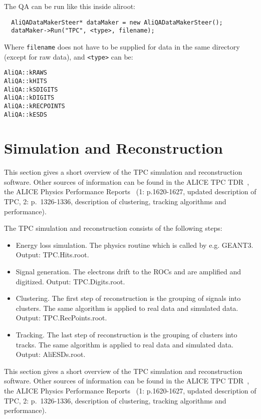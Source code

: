 \documentclass[a4paper,12pt]{article}
\begin{document}
The QA can be run like this inside aliroot:

\begin{verbatim}
  AliQADataMakerSteer* dataMaker = new AliQADataMakerSteer();
  dataMaker->Run("TPC", <type>, filename);  
\end{verbatim}

Where \texttt{filename} does not have to be supplied for data in the
same directory (except for raw data), and \texttt{<type>} can be:

\begin{verbatim}
AliQA::kRAWS
AliQA::kHITS
AliQA::kSDIGITS
AliQA::kDIGITS
AliQA::kRECPOINTS
AliQA::kESDS
\end{verbatim}

\newpage

\section{Simulation and Reconstruction}

This section gives a short overview of the TPC simulation and
reconstruction software. Other sources of information can be found in
the ALICE TPC TDR~\cite{tpctdr}, the ALICE Physics Performance
Reports~\cite{Carminati:2004fp,Alessandro:2006yt} (1: p.1620-1627,
updated description of TPC, 2: p.~1326-1336, description of
clustering, tracking algorithms and performance).

The TPC simulation and reconstruction consists of the following steps:
\begin{itemize}
\item Energy loss simulation. The physics routine which is called by
e.g. GEANT3. Output: TPC.Hits.root.
\item Signal generation. The electrons drift to the ROCs and are
amplified and digitized. Output: TPC.Digits.root.
\item Clustering. The first step of reconstruction is the grouping of
signals into clusters. The same algorithm is applied to real data and
simulated data. Output: TPC.RecPoints.root.
\item Tracking. The last step of reconstruction is the grouping of
clusters into tracks. The same algorithm is applied to real data and
simulated data. Output: AliESDs.root.
\end{itemize}
This section gives a short overview of the TPC simulation and
reconstruction software. Other sources of information can be found in
the ALICE TPC TDR~\cite{tpctdr}, the ALICE Physics Performance
Reports~\cite{Carminati:2004fp,Alessandro:2006yt} (1: p.1620-1627,
updated description of TPC, 2: p.~1326-1336, description of
clustering, tracking algorithms and performance).
\end{document}
